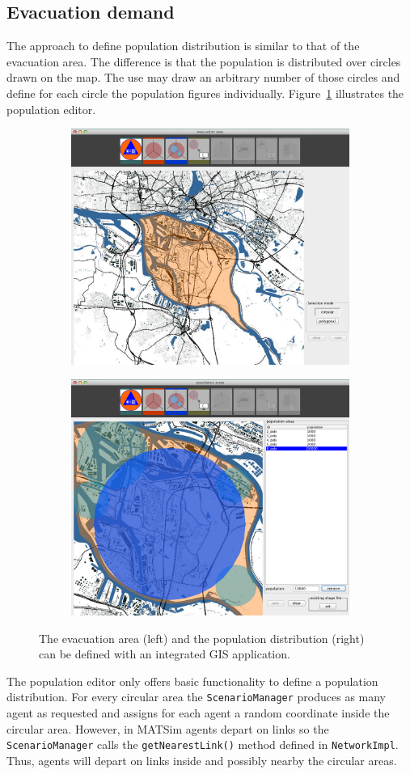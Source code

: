 \subsection{Evacuation demand}
The approach to define population distribution is similar to that of the evacuation area. The difference is that the population is distributed over circles drawn on the map. The use may draw an arbitrary number of those circles and define for each circle the population figures individually. Figure~\ref{chap:evac:fig:area_pop} illustrates the population editor. 
\begin{figure}[!ht]
\begin{subfigure}
\centering
\includegraphics[width=.475\linewidth]{extending/figures/Evacuation/evac_area_sel}
\end{subfigure}\hfill
\begin{subfigure}
\centering
\includegraphics[width=.475\linewidth]{extending/figures/Evacuation/pop_sel}
\end{subfigure}
\caption{The evacuation area (left) and the population distribution (right) can be defined with an integrated GIS application.}\label{chap:evac:fig:area_pop}
\end{figure}
The population editor only offers basic functionality to define a population distribution. For every circular area the \verb+ScenarioManager+ produces as many agent as requested and assigns for each agent a random coordinate inside the circular area. However, in MATSim agents depart on links so the \verb+ScenarioManager+ calls the \verb+getNearestLink()+ method defined in \verb+NetworkImpl+. Thus, agents will depart on links inside and possibly nearby the circular areas. 

